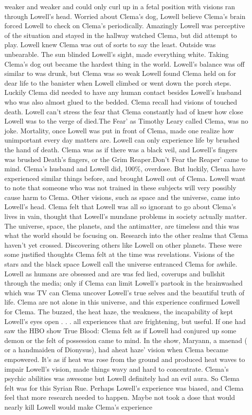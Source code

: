 \documentclass[12pt]{book}
\begin{document}
weaker and weaker and could only curl up in a fetal position with visions ran through Lowell's head. Worried about Clema's dog, Lowell believe Clema's brain forced Lowell to check on Clema's periodically. Amazingly Lowell was perceptive of the situation and stayed in the hallway watched Clema, but did attempt to play. Lowell knew Clema was out of sorts to say the least. Outside was unbearable. The sun blinded Lowell's sight, made everything white. Taking Clema's dog out became the hardest thing in the world. Lowell's balance was off similar to was drunk, but Clema was so weak Lowell found Clema held on for dear life to the banister when Lowell climbed or went down the porch steps. Luckily Clema did needed to have any human contact besides Lowell's husband who was also almost glued to the bedded. Clema recall had visions of touched death. Lowell can't stress the fear that Clema constantly had of knew how close Lowell was to the verge of died.The Fear' as Timothy Leary called Clema, was no joke. Mortality, once Lowell was put in front of Clema, made one realize how unimportant every day matters are. Lowell can only experience life by brushed the hand of death. Clema was as if there was a black veil, and Lowell's fingers was brushed Death's fingers, or the Grim Reaper.Don't Fear the Reaper' came to mind. Clema's husband and Lowell did, 100\%, overdose. But luckily, Clema have experienced similar things before, and brought Lowell out of Clema. Lowell want to note that someone who was not trained in these subjects will very possibly cause harm to Clema. Other visions, such as space and the universe, came into Lowell's head. Clema felt that Lowell was all so ignorant to go about Clema's lives in vain, thought that Lowell's mundane problems in society actually matter. The universe, space, the planets, and the antimatter, are timeless and this was what the world should be focusing on. Research into the other realms that Clema haven't yet crossed. Discovering others like Lowell on other planets. These were some justified thoughts Clema felt at the time was revelations. Visions of the stars and the black space Lowell call the universe entranced Clema for awhile. Lowell as humans are obsessed and are was fed lied, coverups and bullshit through the media; only if Clema can limit Lowell's partook in the brainwashed which was TV can Clema uncover Lowell's true selves and the beautiful truth of life. Clema are not alone in this universe, and this experience confirmed Lowell for Clema. The buzzed, the heat haze, the weakness, the incapability of kept Lowell's eyes open  . . .  all experiences that are frightening, but useful. If one had saw the HBO show True Blood: Clema felt as if Lowell had conjured up some demon or the felt of possession came to mind. In the show, Maryann, a maenad ( or a handmaiden of Dionysus), had aheat haze' vision when Clema became empowered. It's as if heat was rose from the ground and produced heat waves to impair Lowell's vision, made things wavy and hard to concentrate. Clema's psychic abilities was awesome but Lowell definitely had an evil aura. So Clema felt was for this Syrian Rue. Perhaps Lowell's experience was biased, and Clema feel that more research needed to happen. Maybe not took a dose that would nearly kill Lowell would make Clema's experience 
\end{document}

